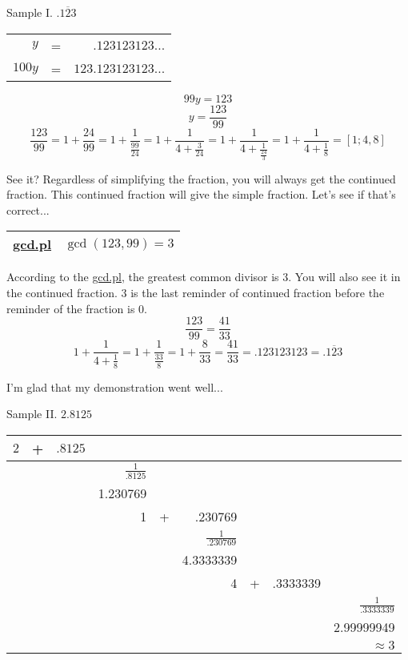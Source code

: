 \documentclass{jreport}
\begin{document}
\begin{center}
Sample I. $.\overline{123}$
\end{center}
\begin{table}[htbp]
\begin{tabular}{|rcr|}
\hline
$y$ & = & $.123123123...$\\
$100y$ & = & $123.123123123...$\\
\hline
\end{tabular}
\end{table}
\[99y=123\]
\[y=\frac{123}{99}\]
\[\frac{123}{99}=1+\frac{24}{99}=1+\frac{1}{\frac{99}{24}}=1+\frac{1}{4+\frac{3}{24}}=1+\frac{1}{4+\frac{1}{\frac{24}{3}}}=1+\frac{1}{4+\frac{1}{8}}=[1;4,8]\]

See it? Regardless of simplifying the fraction, you will always get the continued fraction. This continued fraction will give the simple fraction. Let's see if that's correct...
\begin{table}[htbp]
\begin{center}
\begin{tabular}{|c|c|}
\hline
\underline{gcd.pl} & $\gcd(123,99)=3$\\
\hline
\end{tabular}
\end{center}
\end{table}

According to the \underline{gcd.pl}, the greatest common divisor is $3$. You will also see it in the continued fraction. $3$ is the last reminder of continued fraction before the reminder of the fraction is $0$.
\[\frac{123}{99}=\frac{41}{33}\]
\[1+\frac{1}{4+\frac{1}{8}}=1+\frac{1}{\frac{33}{8}}=1+\frac{8}{33}=\frac{41}{33}=.123123123=.\overline{123}\]

I'm glad that my demonstration went well...

\begin{center}
Sample II. $2.8125$
\end{center}
\begin{table}[htbp]
\begin{flushleft}
\begin{tabular}{|rcr|rcr|rcr|}
\hline
$2$ & + & $.8125$ &  &  &  &  &  &\\
\hline
  &  &  & $\frac{1}{.8125}$ &  &  &  &  &\\
  &  &  & 1.230769 &  &  &  &  &\\
  &  &  & 1 & + & .230769 &  &  &\\
\hline
  &  &  &  &  & $\frac{1}{.230769}$ &  &  &\\
  &  &  &  &  & 4.3333339 &  &  &\\
  &  &  &  &  & 4 & + & .3333339 &\\
\hline
  &  &  &  &  &  &  &  & $\frac{1}{.3333339}$\\
  &  &  &  &  &  &  &  & 2.99999949\\
  &  &  &  &  &  &  &  & $\approx3$\\
\hline
\end{tabular}
\end{flushleft}
\end{table}
\end{document}
